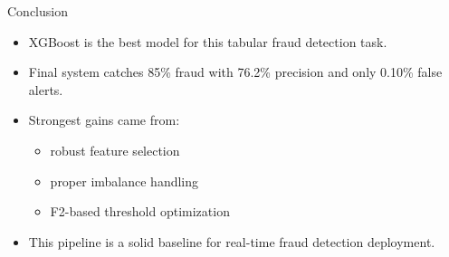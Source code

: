\documentclass[10pt,aspectratio=169]{beamer}
\begin{document}
\begin{frame}{Conclusion}
  \begin{itemize}
    \item XGBoost is the best model for this tabular fraud detection task.
    \item Final system catches 85\% fraud with 76.2\% precision and only 0.10\% false alerts.
    \item Strongest gains came from:
      \begin{itemize}
        \item robust feature selection
        \item proper imbalance handling
        \item F2-based threshold optimization
      \end{itemize}
    \item This pipeline is a solid baseline for real-time fraud detection deployment.
  \end{itemize}
\end{frame}
\end{document}
